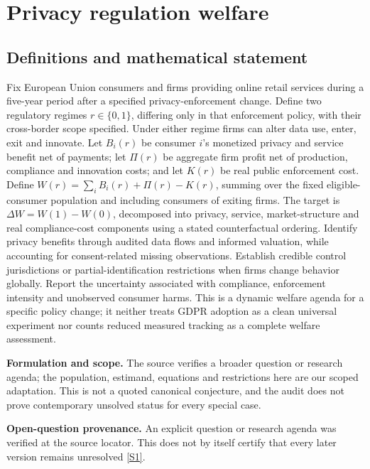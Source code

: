 \documentclass[11pt]{article}
\newcommand{\sref}[2]{\hyperlink{source:#1:#2}{[S#2]}}
\begin{document}
\section*{Privacy regulation welfare}\label{30007690}
\subsection{Definitions and mathematical statement}
Fix European Union consumers and firms providing online retail services during a five-year period after a specified privacy-enforcement change. Define two regulatory regimes \(r\in\{0,1\}\), differing only in that enforcement policy, with their cross-border scope specified. Under either regime firms can alter data use, enter, exit and innovate. Let \(B_i(r)\) be consumer \(i\)'s monetized privacy and service benefit net of payments; let \(\Pi(r)\) be aggregate firm profit net of production, compliance and innovation costs; and let \(K(r)\) be real public enforcement cost. Define \(W(r)=\sum_i B_i(r)+\Pi(r)-K(r)\), summing over the fixed eligible-consumer population and including consumers of exiting firms. The target is \(\Delta W=W(1)-W(0)\), decomposed into privacy, service, market-structure and real compliance-cost components using a stated counterfactual ordering. Identify privacy benefits through audited data flows and informed valuation, while accounting for consent-related missing observations. Establish credible control jurisdictions or partial-identification restrictions when firms change behavior globally. Report the uncertainty associated with compliance, enforcement intensity and unobserved consumer harms. This is a dynamic welfare agenda for a specific policy change; it neither treats GDPR adoption as a clean universal experiment nor counts reduced measured tracking as a complete welfare assessment.

\par\textbf{Formulation and scope.} The source verifies a broader question or research agenda; the population, estimand, equations and restrictions here are our scoped adaptation. This is not a quoted canonical conjecture, and the audit does not prove contemporary unsolved status for every special case.

\par\textbf{Open-question provenance.} An explicit question or research agenda was verified at the source locator. This does not by itself certify that every later version remains unresolved \sref{30007690}{1}.
\end{document}
